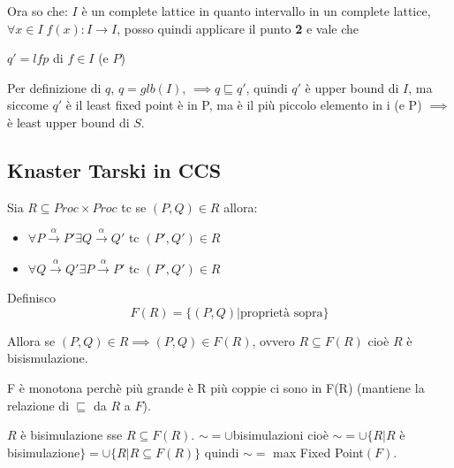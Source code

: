 \documentclass{article}
\newcommand{\passo}{\xrightarrow{\alpha}}
\begin{document}
Ora so che: $I$ è un complete lattice in quanto intervallo in un complete lattice, $\forall x \in I \; f(x):I \to I$, posso quindi applicare il punto \textbf{2} e vale che 
\begin{center}
$q'=lfp$ di $f \in I$ (e $P$)
\end{center}

Per definizione di $q$, $q=glb(I)$, $\implies q \sqsubseteq q'$, quindi $q'$ è upper bound di $I$, ma siccome $q'$ è il least fixed point è in P, ma è il più piccolo elemento in i (e P) $\implies$ è least upper bound di $S$.

\subsection{Knaster Tarski in CCS}

Sia $R \subseteq Proc \times Proc$ tc se $(P, Q) \in R$ allora:
\begin{itemize}
    \item $\forall P \passo P' \exists Q \passo Q'$ tc $(P', Q') \in R$
    \item $\forall Q \passo Q' \exists P \passo P'$ tc $(P', Q') \in R$
\end{itemize}

Definisco $$F(R) = \{ (P,Q) | \text{proprietà sopra} \} $$

Allora se $(P,Q) \in R \implies (P,Q) \in F(R)$, ovvero $R \subseteq F(R)$ cioè $R$ è bisismulazione.

F è monotona perchè più grande è R più coppie ci sono in F(R) (mantiene la relazione di $\sqsubseteq$ da $R$ a $F$).

$R$ è bisimulazione sse $R \subseteq F(R)$. $ \sim= \cup$bisimulazioni cioè $\sim = \cup \{ R |R $ è bisimulazione$\} = \cup \{R | R \subseteq F(R)\} $ quindi $\sim = $ max Fixed Point$(F)$.
\end{document}
